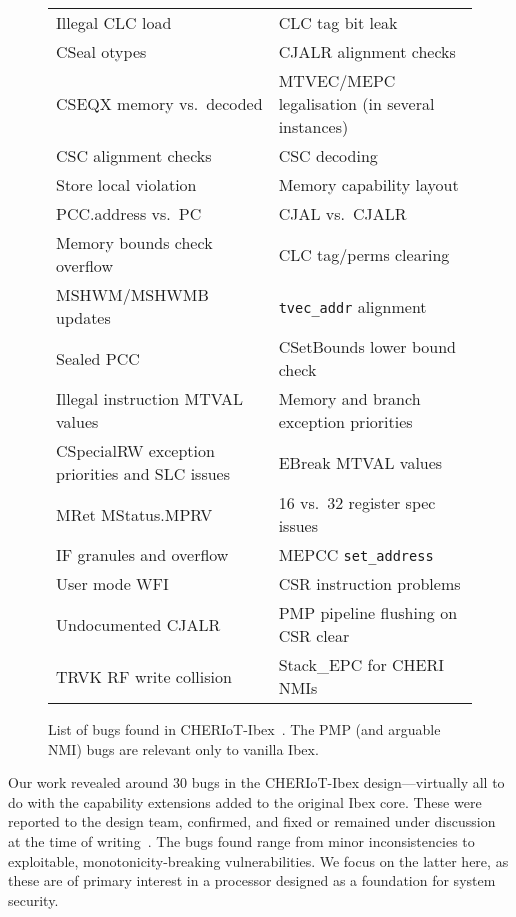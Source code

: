 \documentclass[10pt,conference]{IEEEtran}
\begin{document}
\begin{figure*}[bt]\small
\centering
\begin{center}
\begin{tabular}{ l | l }
  Illegal CLC load & CLC tag bit leak \\
  CSeal otypes & CJALR alignment checks \\
  CSEQX memory vs.~decoded & MTVEC/MEPC legalisation (in several instances) \\
  CSC alignment checks & CSC decoding \\
  Store local violation & Memory capability layout \\
  PCC.address vs.~PC & CJAL vs.~CJALR \\
  Memory bounds check overflow & CLC tag/perms clearing \\
  MSHWM/MSHWMB updates & \verb|tvec_addr| alignment \\
  Sealed PCC & CSetBounds lower bound check \\
  Illegal instruction MTVAL values & Memory and branch exception priorities \\
  CSpecialRW exception priorities and SLC issues & EBreak MTVAL values \\
  MRet MStatus.MPRV & 16 vs.~32 register spec issues \\
  IF granules and overflow & MEPCC \verb|set_address| \\
  User mode WFI & CSR instruction problems \\
  Undocumented CJALR & PMP pipeline flushing on CSR clear \\
  TRVK RF write collision & Stack\_EPC for CHERI NMIs \\
\end{tabular}
\end{center}
\caption{List of bugs found in CHERIoT-Ibex~\cite{CHERIoT-Ibex-issues}. The PMP (and arguable NMI) bugs are relevant only to vanilla Ibex.}\label{bugs.fig}
\end{figure*}

Our work revealed around 30 bugs in the CHERIoT-Ibex design---virtually all
to do with the capability extensions added to the original Ibex core. These
were reported to the design team, confirmed, and fixed or remained under
discussion at the time of writing~\cite{CHERIoT-Ibex-issues}. The bugs found range from minor
inconsistencies to exploitable, monotonicity-breaking vulnerabilities. We
focus on the latter here, as these are of primary interest in a processor
designed as a foundation for system security.
\end{document}
